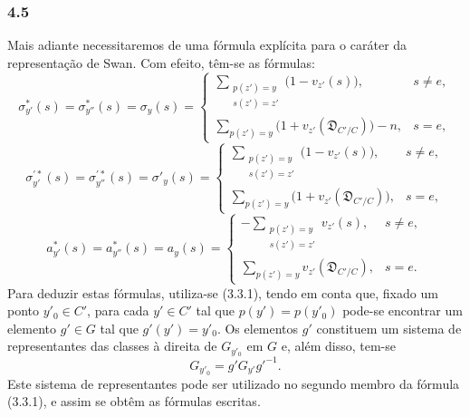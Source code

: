 \subsubsection*{4.5}

Mais adiante necessitaremos de uma fórmula explícita para o caráter da representação de Swan. Com efeito, têm-se as fórmulas:
\[
\sigma^{*}_{y'}(s)=\sigma^{*}_{y''}(s)=\sigma_y(s)=
\begin{cases}
\displaystyle\sum_{\substack{p(z')=y\\s(z')=z'}}\bigl(1-v_{z'}(s)\bigr),& s\ne e,\\[0.8em]
\displaystyle\sum_{p(z')=y}\bigl(1+v_{z'}(\mathfrak D_{C'/C})\bigr)-n,& s=e,
\end{cases}
\tag{4.5.1}
\]
\[
\sigma^{\prime*}_{y'}(s)=\sigma^{\prime*}_{y''}(s)=\sigma'_y(s)=
\begin{cases}
\displaystyle\sum_{\substack{p(z')=y\\s(z')=z'}}\bigl(1-v_{z'}(s)\bigr),& s\ne e,\\[0.8em]
\displaystyle\sum_{p(z')=y}\bigl(1+v_{z'}(\mathfrak D_{C'/C})\bigr),& s=e,
\end{cases}
\tag{4.5.2}
\]
\[
a^{*}_{y'}(s)=a^{*}_{y''}(s)=a_y(s)=
\begin{cases}
\displaystyle-\sum_{\substack{p(z')=y\\s(z')=z'}}v_{z'}(s),& s\ne e,\\[0.8em]
\displaystyle\sum_{p(z')=y}v_{z'}(\mathfrak D_{C'/C}),& s=e.
\end{cases}
\tag{4.5.3}
\]
Para deduzir estas fórmulas, utiliza-se (3.3.1), tendo em conta que, fixado um ponto $y'_0\in C'$, para cada $y'\in C'$ tal que $p(y')=p(y'_0)$ pode-se encontrar um elemento $g'\in G$ tal que $g'(y')=y'_0$. Os elementos $g'$ constituem um sistema de representantes das classes à direita de $G_{y'_0}$ em $G$ e, além disso, tem-se
\[
G_{y'_0}=g'G_{y'}g'^{-1}.
\]
Este sistema de representantes pode ser utilizado no segundo membro da fórmula (3.3.1), e assim se obtêm as fórmulas escritas.
